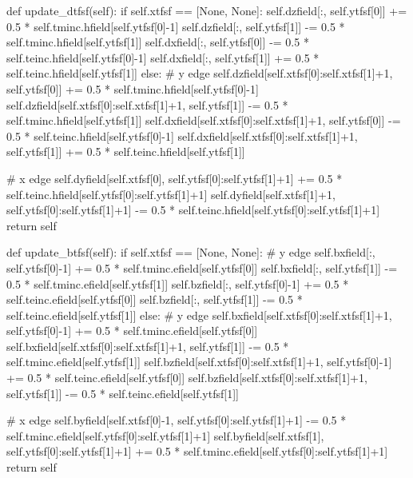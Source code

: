 \begin{code}
    def update_dtfsf(self):
        if self.xtfsf == [None, None]:
            self.dzfield[:, self.ytfsf[0]]
            += 0.5 * self.tminc.hfield[self.ytfsf[0]-1]
            self.dzfield[:, self.ytfsf[1]] 
            -= 0.5 * self.tminc.hfield[self.ytfsf[1]]
            self.dxfield[:, self.ytfsf[0]]  
            -= 0.5 * self.teinc.hfield[self.ytfsf[0]-1]
            self.dxfield[:, self.ytfsf[1]]  
            += 0.5 * self.teinc.hfield[self.ytfsf[1]]
        else:
            # y edge
            self.dzfield[self.xtfsf[0]:self.xtfsf[1]+1, self.ytfsf[0]]  
            += 0.5 * self.tminc.hfield[self.ytfsf[0]-1]
            self.dzfield[self.xtfsf[0]:self.xtfsf[1]+1, self.ytfsf[1]]  
            -= 0.5 * self.tminc.hfield[self.ytfsf[1]]
            self.dxfield[self.xtfsf[0]:self.xtfsf[1]+1, self.ytfsf[0]]  
            -= 0.5 * self.teinc.hfield[self.ytfsf[0]-1]
            self.dxfield[self.xtfsf[0]:self.xtfsf[1]+1, self.ytfsf[1]]  
            += 0.5 * self.teinc.hfield[self.ytfsf[1]]

            # x edge
            self.dyfield[self.xtfsf[0],   self.ytfsf[0]:self.ytfsf[1]+1] 
            += 0.5 * self.teinc.hfield[self.ytfsf[0]:self.ytfsf[1]+1]
            self.dyfield[self.xtfsf[1]+1, self.ytfsf[0]:self.ytfsf[1]+1] 
            -= 0.5 * self.teinc.hfield[self.ytfsf[0]:self.ytfsf[1]+1]
        return self


    def update_btfsf(self):
        if self.xtfsf == [None, None]:
            # y edge
            self.bxfield[:, self.ytfsf[0]-1]
            += 0.5 * self.tminc.efield[self.ytfsf[0]]
            self.bxfield[:, self.ytfsf[1]]  
            -= 0.5 * self.tminc.efield[self.ytfsf[1]]
            self.bzfield[:, self.ytfsf[0]-1]
            += 0.5 * self.teinc.efield[self.ytfsf[0]]
            self.bzfield[:, self.ytfsf[1]]  
            -= 0.5 * self.teinc.efield[self.ytfsf[1]]
        else:
            # y edge
            self.bxfield[self.xtfsf[0]:self.xtfsf[1]+1, self.ytfsf[0]-1] 
            += 0.5 * self.tminc.efield[self.ytfsf[0]]
            self.bxfield[self.xtfsf[0]:self.xtfsf[1]+1, self.ytfsf[1]]   
            -= 0.5 * self.tminc.efield[self.ytfsf[1]]
            self.bzfield[self.xtfsf[0]:self.xtfsf[1]+1, self.ytfsf[0]-1] 
            += 0.5 * self.teinc.efield[self.ytfsf[0]]
            self.bzfield[self.xtfsf[0]:self.xtfsf[1]+1, self.ytfsf[1]]   
            -= 0.5 * self.teinc.efield[self.ytfsf[1]]

            # x edge
            self.byfield[self.xtfsf[0]-1, self.ytfsf[0]:self.ytfsf[1]+1] 
            -= 0.5 * self.tminc.efield[self.ytfsf[0]:self.ytfsf[1]+1]
            self.byfield[self.xtfsf[1],   self.ytfsf[0]:self.ytfsf[1]+1]
            += 0.5 * self.tminc.efield[self.ytfsf[0]:self.ytfsf[1]+1]
        return self
\end{code}
